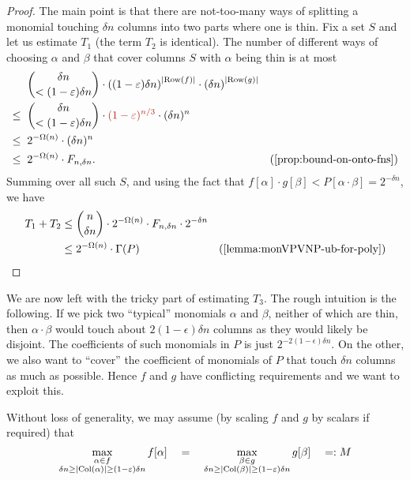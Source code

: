 \begin{proof}
  The main point is that there are not-too-many ways of splitting a monomial touching $\delta n$ columns into two parts where one is thin.
  Fix a set $S$ and let us estimate $T_1$ (the term $T_2$ is identical).
  The number of different ways of choosing $\alpha$ and $\beta$ that cover columns $S$ with $\alpha$ being thin is at most
  \begin{align*}
    & \;\; \binom{\delta n}{< (1 - \epsilon)\delta n} \cdot \inparen{(1- \epsilon)\delta n}^{\abs{\Row(f)}} \cdot \inparen{\delta n}^{\abs{\Row(g)}}\\
    \leq & \;\; \binom{\delta n}{< (1 - \epsilon)\delta n} \cdot \textcolor{BrickRed}{(1 - \epsilon)^{n/3}} \cdot (\delta n)^n \\
    \leq & \;\; 2^{-\Omega(n)} \cdot (\delta n)^n\\
    \leq & \;\; 2^{-\Omega(n)} \cdot F_{n,\delta n}. &\text{(\autoref{prop:bound-on-onto-fns})}
  \end{align*}
  Summing over all such $S$, and using the fact that $f[\alpha] \cdot g[\beta] < P[\alpha \cdot \beta] = 2^{-\delta n}$, we have
  \begin{align*}
    T_1 + T_2 & \leq \binom{n}{\delta n} \cdot 2^{- \Omega(n)} \cdot F_{n,\delta n} \cdot 2^{-\delta n} \\
    & \leq 2^{-\Omega(n)} \cdot \Gamma(P) & \text{(\autoref{lemma:monVPVNP-ub-for-poly})}
  \end{align*}
\end{proof}

\noindent
We are now left with the tricky part of estimating $T_3$. The rough intuition is the following. If we pick two ``typical'' monomials $\alpha$ and $\beta$, neither of which are thin, then $\alpha \cdot \beta$ would touch about $2(1-\epsilon)\delta n$ columns as they would likely be disjoint. The coefficients of such monomials in $P$ is just $2^{-2(1-\epsilon)\delta n}$. On the other, we also want to ``cover'' the coefficient of monomials of $P$ that touch $\delta n$ columns as much as possible. Hence $f$ and $g$ have conflicting requirements and we want to exploit this.

Without loss of generality, we may assume (by scaling $f$ and $g$ by scalars if required) that
\[
  \max_{\substack{\alpha \in f \\ \delta n \geq \left|\operatorname{Col}(\alpha)\right| \geq (1-\varepsilon)\delta n}} f[\alpha] \quad=\quad   \max_{\substack{\beta \in g \\ \delta n \geq \left|\operatorname{Col}(\beta)\right| \geq (1-\varepsilon)\delta n}}  g[\beta] \quad =: M 
\]
